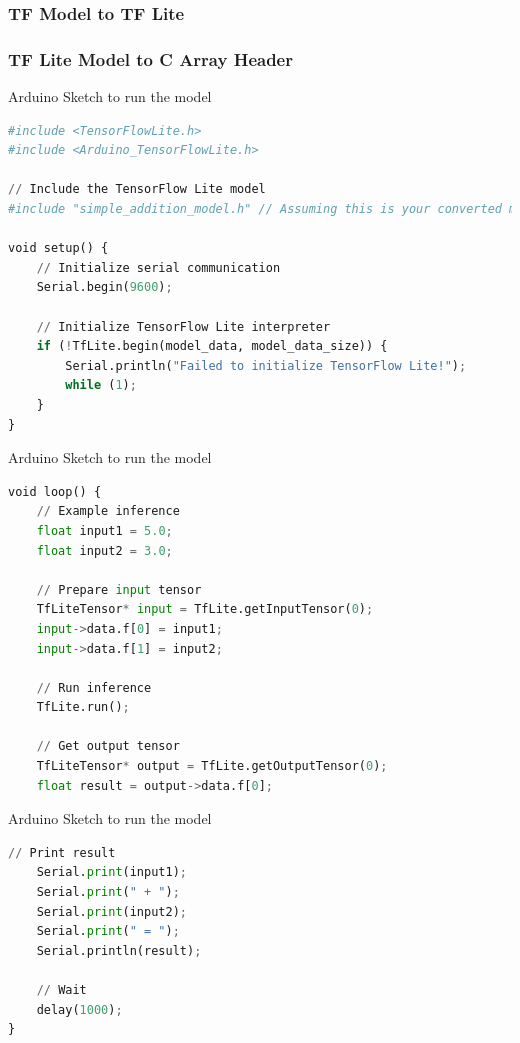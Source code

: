 \begin{frame}[fragile]
	\frametitle{TF Model to TF Lite}
	
	
\end{frame}

\begin{frame}[fragile]
	\frametitle{TF Lite Model to C Array Header}
	
	
\end{frame}

\begin{frame}[fragile]{Arduino Sketch to run the model}
	
	\begin{lstlisting}[language=Python]
#include <TensorFlowLite.h>
#include <Arduino_TensorFlowLite.h>

// Include the TensorFlow Lite model
#include "simple_addition_model.h" // Assuming this is your converted model header file

void setup() {
	// Initialize serial communication
	Serial.begin(9600);
	
	// Initialize TensorFlow Lite interpreter
	if (!TfLite.begin(model_data, model_data_size)) {
		Serial.println("Failed to initialize TensorFlow Lite!");
		while (1);
	}
}
	\end{lstlisting}

\end{frame}


\begin{frame}[fragile]{Arduino Sketch to run the model}
	
	\begin{lstlisting}[language=Python]
void loop() {
	// Example inference
	float input1 = 5.0;
	float input2 = 3.0;
	
	// Prepare input tensor
	TfLiteTensor* input = TfLite.getInputTensor(0);
	input->data.f[0] = input1;
	input->data.f[1] = input2;
	
	// Run inference
	TfLite.run();
	
	// Get output tensor
	TfLiteTensor* output = TfLite.getOutputTensor(0);
	float result = output->data.f[0];
	\end{lstlisting}

\end{frame}
\begin{frame}[fragile]{Arduino Sketch to run the model}
	
	\begin{lstlisting}[language=Python]
	// Print result
	Serial.print(input1);
	Serial.print(" + ");
	Serial.print(input2);
	Serial.print(" = ");
	Serial.println(result);
	
	// Wait
	delay(1000);
}
	\end{lstlisting}
	
\end{frame}


